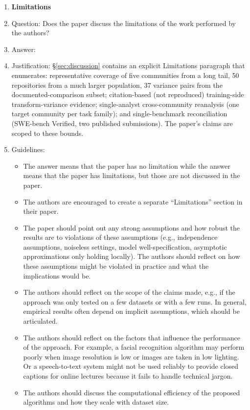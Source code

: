 \begin{enumerate}
\item {\bf Limitations}
    \item[] Question: Does the paper discuss the limitations of the work performed by the authors?
    \item[] Answer: \answerYes{}
    \item[] Justification: \S\ref{sec:discussion} contains an explicit Limitations paragraph that enumerates: representative coverage of five communities from a long tail, 50 repositories from a much larger population, 37 variance pairs from the documented-comparison subset; citation-based (not reproduced) training-side transform-variance evidence; single-analyst cross-community reanalysis (one target community per task family); and single-benchmark reconciliation (SWE-bench Verified, two published submissions). The paper's claims are scoped to these bounds.
    \item[] Guidelines:
    \begin{itemize}
        \item The answer \answerNA{} means that the paper has no limitation while the answer \answerNo{} means that the paper has limitations, but those are not discussed in the paper.
        \item The authors are encouraged to create a separate ``Limitations'' section in their paper.
        \item The paper should point out any strong assumptions and how robust the results are to violations of these assumptions (e.g., independence assumptions, noiseless settings, model well-specification, asymptotic approximations only holding locally). The authors should reflect on how these assumptions might be violated in practice and what the implications would be.
        \item The authors should reflect on the scope of the claims made, e.g., if the approach was only tested on a few datasets or with a few runs. In general, empirical results often depend on implicit assumptions, which should be articulated.
        \item The authors should reflect on the factors that influence the performance of the approach. For example, a facial recognition algorithm may perform poorly when image resolution is low or images are taken in low lighting. Or a speech-to-text system might not be used reliably to provide closed captions for online lectures because it fails to handle technical jargon.
        \item The authors should discuss the computational efficiency of the proposed algorithms and how they scale with dataset size.

\end{itemize}
\end{enumerate}
